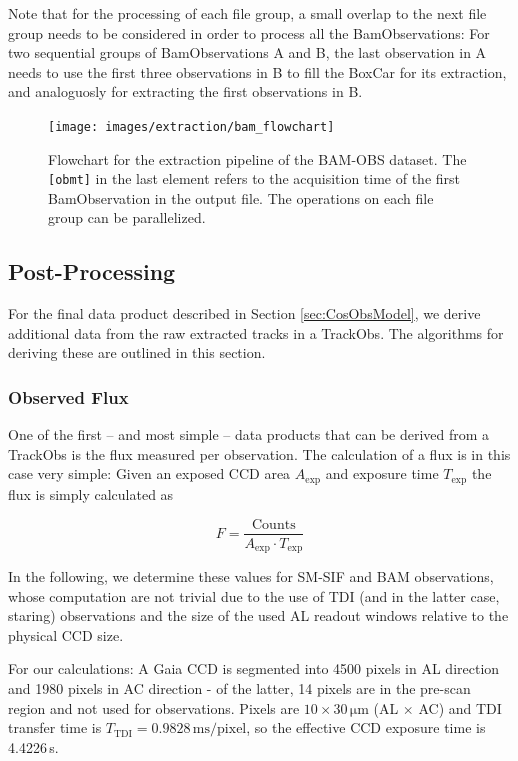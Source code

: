 \documentclass[a4paper, 11pt]{article}
\begin{document}
Note that for the processing of each file group, a small overlap to the next file group needs to be considered in order to process all the BamObservations: For two sequential groups of BamObservations A and B, the last observation in A needs to use the first three observations in B to fill the BoxCar for its extraction, and analoguosly for extracting the first observations in B.

\begin{figure}
  \centering
  \texttt{[image: images/extraction/bam\_flowchart]}
  \caption{Flowchart for the extraction pipeline of the BAM-OBS dataset. The \texttt{[obmt]} in the last element refers to the acquisition time of the first BamObservation in the output file. The operations on each file group can be parallelized.}
  \label{fig:flow_bam}
\end{figure}


\subsection{Post-Processing}
\label{sec:postprocessing}
For the final data product described in Section \ref{sec:CosObsModel}, we derive additional data from the raw extracted tracks in a TrackObs. The algorithms for deriving these are outlined in this section.
\subsubsection{Observed Flux}
\label{sec:obs_flux}

One of the first -- and most simple -- data products that can be derived from a TrackObs is the flux measured per observation. The calculation of a flux is in this case very simple: Given an exposed CCD area $A_\mathrm{exp}$ and exposure time $T_\mathrm{exp}$ the flux is simply calculated as

\begin{equation}
  F = \frac{\mathrm{Counts}}{A_\mathrm{exp} \cdot T_\mathrm{exp}}
\end{equation}

In the following, we determine these values for SM-SIF and BAM observations, whose computation are not trivial due to the use of TDI (and in the latter case, staring) observations and the size of the used AL readout windows relative to the physical CCD size.

For our calculations: A Gaia CCD is segmented into 4500 pixels in AL direction and 1980 pixels in AC direction - of the latter, 14 pixels are in the pre-scan region and not used for observations. Pixels are $10 \times 30\, \mathrm{\mu m}$ (AL $\times$ AC) and TDI transfer time is $T_\mathrm{TDI} = 0.9828\, \mathrm{ms/pixel}$, so the effective CCD exposure time is 4.4226\,s.
\end{document}
